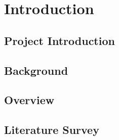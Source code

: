 \chapter{Introduction}

\section{Project Introduction}

\section{Background}

\section{Overview}

\section{Literature Survey}

